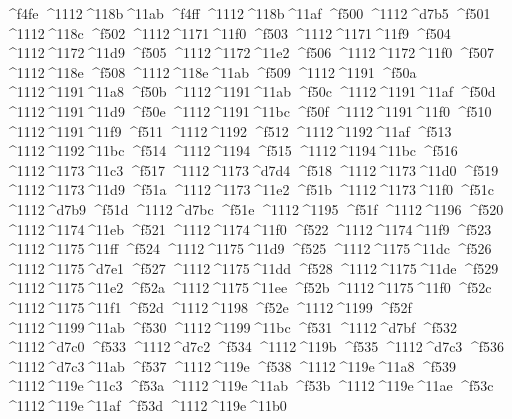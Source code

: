 \checkit ^^^^f4fe ^^^^1112^^^^118b^^^^11ab
\checkit ^^^^f4ff ^^^^1112^^^^118b^^^^11af
\checkit ^^^^f500 ^^^^1112^^^^d7b5
\checkit ^^^^f501 ^^^^1112^^^^118c
\checkit ^^^^f502 ^^^^1112^^^^1171^^^^11f0
\checkit ^^^^f503 ^^^^1112^^^^1171^^^^11f9
\checkit ^^^^f504 ^^^^1112^^^^1172^^^^11d9
\checkit ^^^^f505 ^^^^1112^^^^1172^^^^11e2
\checkit ^^^^f506 ^^^^1112^^^^1172^^^^11f0
\checkit ^^^^f507 ^^^^1112^^^^118e
\checkit ^^^^f508 ^^^^1112^^^^118e^^^^11ab
\checkit ^^^^f509 ^^^^1112^^^^1191
\checkit ^^^^f50a ^^^^1112^^^^1191^^^^11a8
\checkit ^^^^f50b ^^^^1112^^^^1191^^^^11ab
\checkit ^^^^f50c ^^^^1112^^^^1191^^^^11af
\checkit ^^^^f50d ^^^^1112^^^^1191^^^^11d9
\checkit ^^^^f50e ^^^^1112^^^^1191^^^^11bc
\checkit ^^^^f50f ^^^^1112^^^^1191^^^^11f0
\checkit ^^^^f510 ^^^^1112^^^^1191^^^^11f9
\checkit ^^^^f511 ^^^^1112^^^^1192
\checkit ^^^^f512 ^^^^1112^^^^1192^^^^11af
\checkit ^^^^f513 ^^^^1112^^^^1192^^^^11bc
\checkit ^^^^f514 ^^^^1112^^^^1194
\checkit ^^^^f515 ^^^^1112^^^^1194^^^^11bc
\checkit ^^^^f516 ^^^^1112^^^^1173^^^^11c3
\checkit ^^^^f517 ^^^^1112^^^^1173^^^^d7d4
\checkit ^^^^f518 ^^^^1112^^^^1173^^^^11d0
\checkit ^^^^f519 ^^^^1112^^^^1173^^^^11d9
\checkit ^^^^f51a ^^^^1112^^^^1173^^^^11e2
\checkit ^^^^f51b ^^^^1112^^^^1173^^^^11f0
\checkit ^^^^f51c ^^^^1112^^^^d7b9
\checkit ^^^^f51d ^^^^1112^^^^d7bc
\checkit ^^^^f51e ^^^^1112^^^^1195
\checkit ^^^^f51f ^^^^1112^^^^1196
\checkit ^^^^f520 ^^^^1112^^^^1174^^^^11eb
\checkit ^^^^f521 ^^^^1112^^^^1174^^^^11f0
\checkit ^^^^f522 ^^^^1112^^^^1174^^^^11f9
\checkit ^^^^f523 ^^^^1112^^^^1175^^^^11ff
\checkit ^^^^f524 ^^^^1112^^^^1175^^^^11d9
\checkit ^^^^f525 ^^^^1112^^^^1175^^^^11dc
\checkit ^^^^f526 ^^^^1112^^^^1175^^^^d7e1
\checkit ^^^^f527 ^^^^1112^^^^1175^^^^11dd
\checkit ^^^^f528 ^^^^1112^^^^1175^^^^11de
\checkit ^^^^f529 ^^^^1112^^^^1175^^^^11e2
\checkit ^^^^f52a ^^^^1112^^^^1175^^^^11ee
\checkit ^^^^f52b ^^^^1112^^^^1175^^^^11f0
\checkit ^^^^f52c ^^^^1112^^^^1175^^^^11f1
\checkit ^^^^f52d ^^^^1112^^^^1198
\checkit ^^^^f52e ^^^^1112^^^^1199
\checkit ^^^^f52f ^^^^1112^^^^1199^^^^11ab
\checkit ^^^^f530 ^^^^1112^^^^1199^^^^11bc
\checkit ^^^^f531 ^^^^1112^^^^d7bf
\checkit ^^^^f532 ^^^^1112^^^^d7c0
\checkit ^^^^f533 ^^^^1112^^^^d7c2
\checkit ^^^^f534 ^^^^1112^^^^119b
\checkit ^^^^f535 ^^^^1112^^^^d7c3
\checkit ^^^^f536 ^^^^1112^^^^d7c3^^^^11ab
\checkit ^^^^f537 ^^^^1112^^^^119e
\checkit ^^^^f538 ^^^^1112^^^^119e^^^^11a8
\checkit ^^^^f539 ^^^^1112^^^^119e^^^^11c3
\checkit ^^^^f53a ^^^^1112^^^^119e^^^^11ab
\checkit ^^^^f53b ^^^^1112^^^^119e^^^^11ae
\checkit ^^^^f53c ^^^^1112^^^^119e^^^^11af
\checkit ^^^^f53d ^^^^1112^^^^119e^^^^11b0
